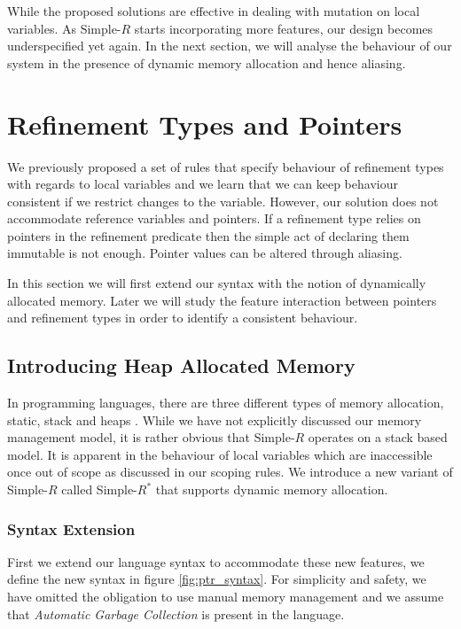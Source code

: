 \documentclass[a4paper,12pt]{report}
\begin{document}
\par
While the proposed solutions are effective in dealing with mutation on local 
variables. As Simple-$R$ starts incorporating more features, our design becomes 
underspecified yet again. In the next section, we will analyse 
the behaviour of our system in the presence of dynamic memory allocation 
and hence aliasing.

\section{Refinement Types and Pointers}
We previously proposed a set of rules that specify behaviour of refinement 
types with regards to local variables and we learn that we can keep behaviour 
consistent if we restrict changes to the variable. However, our solution does 
not accommodate reference variables and pointers. If a refinement type 
relies on pointers in the refinement predicate then the simple act of declaring 
them immutable is not enough. Pointer values can be altered through aliasing. 

\par
In this section we will first extend our syntax with the notion of dynamically 
allocated memory. Later we will study the feature interaction between 
pointers and refinement types in order to identify a consistent behaviour. 

\subsection{Introducing Heap Allocated Memory}
In programming languages, there are three different types of memory allocation, 
static, stack and heaps \cite{heapVsStack}. While we have not explicitly 
discussed our memory management model, it is rather obvious that Simple-$R$ 
operates on a stack based model. It is apparent in the behaviour of local 
variables which are inaccessible once out of scope as discussed in our scoping rules. 
We introduce a new variant of Simple-$R$ called Simple-$R^{*}$ that supports 
dynamic memory allocation.

\subsubsection{Syntax Extension}
First we extend our language syntax to accommodate these new features, we define 
the new syntax in figure \ref{fig:ptr_syntax}. For simplicity and safety, 
we have omitted the obligation to use manual memory management and we 
assume that \textit{Automatic Garbage Collection} \cite{GC} is present in 
the language. 
\end{document}
